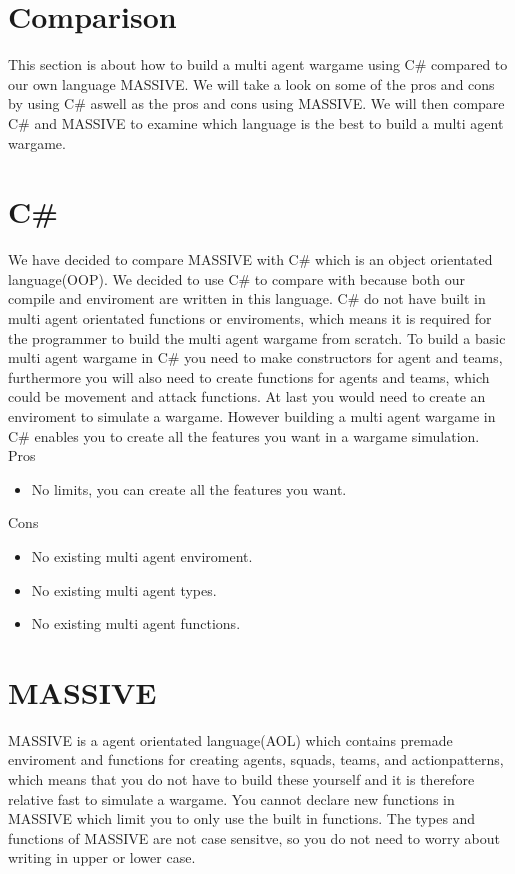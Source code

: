 \section{Comparison}
\indent This section is about how to build a multi agent wargame using C\# compared to our own language MASSIVE. We will take a look on some of the pros and cons by using C\#  aswell as the pros and cons using MASSIVE. We will then compare C\# and MASSIVE to examine which language is the best to build a multi agent wargame.

\section{C\#}
We have decided to compare MASSIVE with C\# which is an object orientated language(OOP). We decided to use C\# to compare with because both our compile and enviroment are written in this language. C\# do not have built in multi agent orientated functions or enviroments, which means it is required for the programmer to build the multi agent wargame from scratch. To build a basic multi agent wargame in C\# you need to make constructors for agent and teams, furthermore you will also need to create functions for agents and teams, which could be movement and attack functions. At last you would need to create an enviroment to simulate a wargame. However building a multi agent wargame in C\# enables you to create all the features you want in a wargame simulation.\\

Pros
\begin{itemize}
	\item No limits, you can create all the features you want.\\
\end{itemize}

Cons
\begin{itemize}
	\item No existing multi agent enviroment.
	\item No existing multi agent types.
	\item No existing multi agent functions.
\end{itemize}

\section{MASSIVE}
MASSIVE is a agent orientated language(AOL) which contains premade enviroment and functions for creating agents, squads, teams, and actionpatterns, which means that you do not have to build these yourself and it is therefore relative fast to simulate a wargame. You cannot declare new functions in MASSIVE which limit you to only use the built in functions. The types and functions of MASSIVE are not case sensitve, so you do not need to worry about writing in upper or lower case.\\

